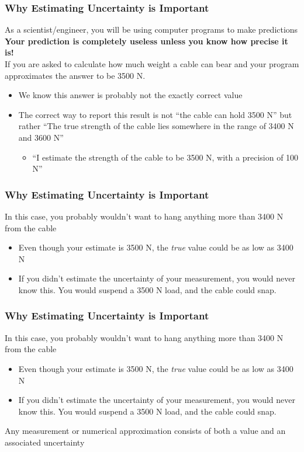 \documentclass{beamer}
\begin{document}
	\begin{frame}
		\frametitle{Why Estimating Uncertainty is Important}
		As a scientist/engineer, you will be using computer programs to make predictions\\
		\textbf{Your prediction is completely useless unless you know how precise it is!}\\
		If you are asked to calculate how much weight a cable can bear and your program approximates the answer to be 3500 N. 
		\begin{itemize}
			\item We know this answer is probably not the exactly correct value
			\item The correct way to report this result is not ``the cable can hold 3500 N'' but rather ``The true strength of the cable lies somewhere in the range of 3400 N and 3600 N''
			\begin{itemize}
				\item <2-> ``I estimate the strength of the cable to be 3500 N, with a precision of 100 N''
			\end{itemize}
		\end{itemize}
	\end{frame}


	\begin{frame}
	\frametitle{Why Estimating Uncertainty is Important}
	In this case, you probably wouldn't want to hang anything more than 3400 N from the cable
	\begin{itemize}
		\item Even though your estimate is 3500 N, the \textit{true} value could be as low as 3400 N
		\item <2-> If you didn't estimate the uncertainty of your measurement, you would never know this. You would suspend a 3500 N load, and the cable could snap.
	\end{itemize}
	\end{frame}

	\begin{frame}
	\frametitle{Why Estimating Uncertainty is Important}
	In this case, you probably wouldn't want to hang anything more than 3400 N from the cable
	\begin{itemize}
		\item Even though your estimate is 3500 N, the \textit{true} value could be as low as 3400 N
		\item If you didn't estimate the uncertainty of your measurement, you would never know this. You would suspend a 3500 N load, and the cable could snap.
	\end{itemize}
	Any measurement or numerical approximation consists of both a value and an associated uncertainty
	\end{frame}
\end{document}
